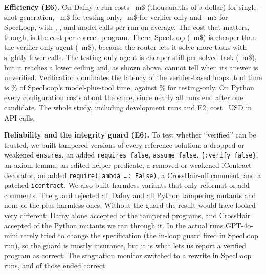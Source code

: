 \textbf{Efficiency (E6).} On Dafny a run costs ~m\$ (thousandths of a dollar) for single-shot generation, ~m\$ for testing-only, ~m\$ for verifier-only and ~m\$ for SpecLoop, with , ,  and  model calls per run on average. The cost that matters, though, is the cost per correct program. There, SpecLoop (~m\$) is cheaper than the verifier-only agent (~m\$), because the router lets it solve more tasks with slightly fewer calls. The testing-only agent is cheaper still per solved task (~m\$), but it reaches a lower ceiling and, as shown above, cannot tell when its answer is unverified. Verification dominates the latency of the verifier-based loops: tool time is \% of SpecLoop's model-plus-tool time, against \% for testing-only. On Python every configuration costs about the same, since nearly all runs end after one candidate. The whole study, including development runs and E2, cost ~USD in API calls.


\textbf{Reliability and the integrity guard (E6).} To test whether ``verified'' can be trusted, we built tampered versions of every reference solution: a dropped or weakened \texttt{ensures}, an added \texttt{requires false}, \texttt{assume false}, \texttt{\{:verify false\}}, an axiom lemma, an edited helper predicate, a removed or weakened iContract decorator, an added \texttt{require(lambda \ldots: False)}, a CrossHair-off comment, and a patched \texttt{icontract}. We also built harmless variants that only reformat or add comments. The guard rejected all  Dafny and all  Python tampering mutants and none of the  plus  harmless ones. Without the guard the result would have looked very different: Dafny alone accepted  of the  tampered programs, and CrossHair accepted  of the  Python mutants we ran through it. In the actual runs GPT-4o-mini rarely tried to change the specification (the in-loop guard fired in  SpecLoop run), so the guard is mostly insurance, but it is what lets us report a verified program as correct. The stagnation monitor switched to a rewrite in  SpecLoop runs, and  of those ended correct.
